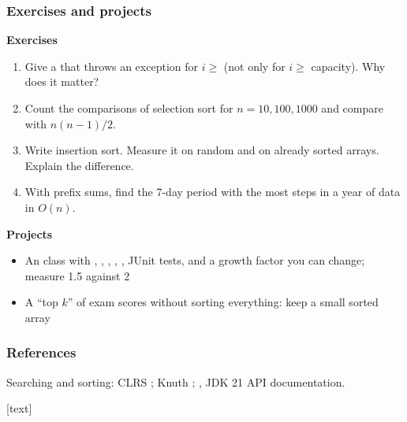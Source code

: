 \documentclass[aspectratio=169,10pt,compress]{beamer}
\begin{document}
\begin{frame}[t,fragile] \frametitle{Exercises and projects}
	\textbf{Exercises}
	\begin{enumerate}\small
		\item Give  a  that throws an exception for $i \ge$ 
		      (not only for $i \ge$ capacity). Why does it matter?
		\item Count the comparisons of selection sort for $n = 10, 100, 1000$ and compare with $n (n - 1) / 2$.
		\item Write insertion sort. Measure it on random and on already sorted arrays. Explain the difference.
		\item With prefix sums, find the 7-day period with the most steps in a year of data in $O(n)$.
	\end{enumerate}

	\textbf{Projects}
	\begin{itemize}\small
		\item An  class with , , , , ,
		      JUnit tests, and a growth factor you can change; measure 1.5 against 2
		\item A ``top $k$'' of exam scores without sorting everything: keep a small sorted array
	\end{itemize}
\end{frame}




\begin{frame}[t,fragile] \frametitle{References}
	\small Searching and sorting: CLRS \cite{cormen2022introduction}; Knuth \cite{knuth1973artv1};
	, JDK 21 API documentation.

	\vspace{1em}
	[text]
	
	\tiny
\end{frame}




\begin{frame}[t,fragile]
	\begin{center}
		\vspace{4cm}
	\end{center}
\end{frame}
\end{document}
